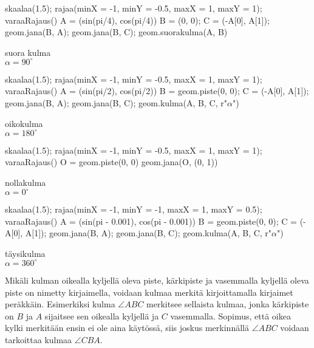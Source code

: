 \begin{minipage}{3cm}
\begin{kuva}
skaalaa(1.5); rajaa(minX = -1, minY = -0.5, maxX = 1, maxY = 1); varaaRajaus()
A = (sin(pi/4), cos(pi/4))
B = (0, 0); C = (-A[0], A[1]); geom.jana(B, A); geom.jana(B, C); geom.suorakulma(A, B)
\end{kuva}
\centering suora kulma \\$\alpha = 90^\circ$
\end{minipage}
\begin{minipage}{3cm}
\begin{kuva}
skaalaa(1.5); rajaa(minX = -1, minY = -0.5, maxX = 1, maxY = 1); varaaRajaus()
A = (sin(pi/2), cos(pi/2))
B = geom.piste(0, 0); C = (-A[0], A[1]); geom.jana(B, A); geom.jana(B, C); geom.kulma(A, B, C, r"$\alpha$")
\end{kuva}
\centering oikokulma \\$\alpha = 180^\circ$
\end{minipage}
\begin{minipage}{3cm}
\begin{kuva}
skaalaa(1.5); rajaa(minX = -1, minY = -0.5, maxX = 1, maxY = 1); varaaRajaus()
O = geom.piste(0, 0)
geom.jana(O, (0, 1))
\end{kuva}
\centering nollakulma \\$\alpha = 0^\circ$
\end{minipage}
\begin{minipage}{3cm}
\begin{kuva}
skaalaa(1.5); rajaa(minX = -1, minY = -1, maxX = 1, maxY = 0.5); varaaRajaus()
A = (sin(pi - 0.001), cos(pi - 0.001))
B = geom.piste(0, 0); C = (-A[0], A[1]); geom.jana(B, A); geom.jana(B, C); geom.kulma(A, B, C, r"$\alpha$")
\end{kuva}
\centering täysikulma \\$\alpha = 360^\circ$
\end{minipage}

Mikäli kulman oikealla kyljellä oleva piste, kärkipiste ja vasemmalla kyljellä oleva piste on nimetty kirjaimella, voidaan kulmaa merkitä kirjoittamalla kirjaimet peräkkäin. Esimerkiksi kulma $\angle ABC$ merkitsee sellaista kulmaa, jonka kärkipiste on $B$ ja $A$ sijaitsee sen oikealla kyljellä ja $C$ vasemmalla. Sopimus, että oikea kylki merkitään ensin ei ole aina käytössä, siis joskus merkinnällä $\angle ABC$ voidaan tarkoittaa kulmaa $\angle CBA$.

